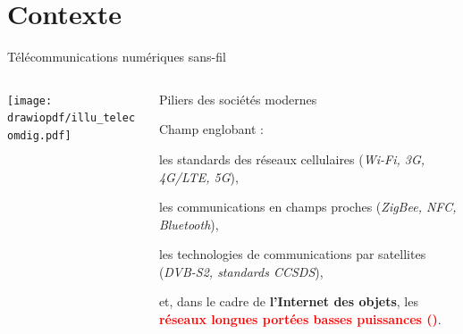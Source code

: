 \documentclass[../main.tex]{subfiles}
\begin{document}
\section*{Contexte}

\begin{frame}{Télécommunications numériques sans-fil}
  \begin{columns}
    \begin{column}{.4\linewidth}
      \begin{center}
        \texttt{[image: drawiopdf/illu\_telecomdig.pdf]}
      \end{center}
    \end{column}
    \begin{column}{.55\linewidth} \large
      \begin{overlayarea}{\linewidth}{.75\textheight}
        \begin{ctrlitemize}{1em}
          \item Piliers des sociétés modernes
          \item Champ englobant :
          \begin{ctrlitemize}{1em}
            \item les standards des réseaux cellulaires (\textit{Wi-Fi, 3G, 4G/LTE, 5G}),
            \item les communications en champs proches (\textit{ZigBee, NFC, Bluetooth}),
            \item les technologies de communications par satellites (\textit{DVB-S2, standards CCSDS}),
            \item et, dans le cadre de \textbf{l'Internet des objets}, les \textbf{\textcolor{red}{réseaux longues portées basses puissances ()}}.
          \end{ctrlitemize}
        \end{ctrlitemize}
      \end{overlayarea}
    \end{column}
  \end{columns}
\end{frame}
\end{document}
